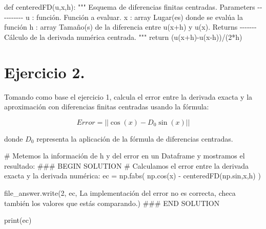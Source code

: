 \documentclass[
  letterpaper,
  DIV=11,
  numbers=noendperiod]{scrreprt}
\newenvironment{Shaded}{\begin{snugshade}}{\end{snugshade}}
\newcommand{\BuiltInTok}[1]{\textcolor[rgb]{0.00,0.23,0.31}{#1}}
\newcommand{\CommentTok}[1]{\textcolor[rgb]{0.37,0.37,0.37}{#1}}
\newcommand{\ControlFlowTok}[1]{\textcolor[rgb]{0.00,0.23,0.31}{#1}}
\newcommand{\DecValTok}[1]{\textcolor[rgb]{0.68,0.00,0.00}{#1}}
\newcommand{\KeywordTok}[1]{\textcolor[rgb]{0.00,0.23,0.31}{#1}}
\newcommand{\NormalTok}[1]{\textcolor[rgb]{0.00,0.23,0.31}{#1}}
\newcommand{\OperatorTok}[1]{\textcolor[rgb]{0.37,0.37,0.37}{#1}}
\newcommand{\RegionMarkerTok}[1]{\textcolor[rgb]{0.00,0.23,0.31}{#1}}
\newcommand{\StringTok}[1]{\textcolor[rgb]{0.13,0.47,0.30}{#1}}
\begin{document}
\begin{Shaded}
\begin{Highlighting}[]
\KeywordTok{def}\NormalTok{ centeredFD(u,x,h):}
    \CommentTok{""" }
\CommentTok{    Esquema de diferencias finitas centradas.}
\CommentTok{    }
\CommentTok{    Parameters}
\CommentTok{    {-}{-}{-}{-}{-}{-}{-}{-}{-}{-}}
\CommentTok{    u : función. }
\CommentTok{    Función a evaluar.}
\CommentTok{    }
\CommentTok{    x : array}
\CommentTok{    Lugar(es) donde se evalúa la función}
\CommentTok{    }
\CommentTok{    h : array}
\CommentTok{    Tamaño(s) de la diferencia entre u(x+h) y u(x).}
\CommentTok{    }
\CommentTok{    Returns}
\CommentTok{    {-}{-}{-}{-}{-}{-}{-}}
\CommentTok{    Cálculo de la derivada numérica centrada.}
\CommentTok{    """}
    \ControlFlowTok{return}\NormalTok{ (u(x}\OperatorTok{+}\NormalTok{h)}\OperatorTok{{-}}\NormalTok{u(x}\OperatorTok{{-}}\NormalTok{h))}\OperatorTok{/}\NormalTok{(}\DecValTok{2}\OperatorTok{*}\NormalTok{h)}
\end{Highlighting}
\end{Shaded}

\section{Ejercicio 2.}\label{ejercicio-2.}

Tomando como base el ejercicio 1, calcula el error entre la derivada
exacta y la aproximación con diferencias finitas centradas usando la
fórmula:

\[
Error = || \cos(x) - D_0 \sin(x)||
\]

donde \(D_0\) representa la aplicación de la fórmula de diferencias
centradas.

\begin{Shaded}
\begin{Highlighting}[]
\CommentTok{\# Metemos la información de h y del error en un Dataframe y mostramos el resultado:}
\CommentTok{\#\#\# }\RegionMarkerTok{BEGIN}\CommentTok{ SOLUTION}
\CommentTok{\# Calculamos el error entre la derivada exacta y la derivada numérica:}
\NormalTok{ec }\OperatorTok{=}\NormalTok{ np.fabs( np.cos(x) }\OperatorTok{{-}}\NormalTok{ centeredFD(np.sin,x,h) )}

\NormalTok{file\_answer.write(}\StringTok{\textquotesingle{}2\textquotesingle{}}\NormalTok{, ec, }\StringTok{\textquotesingle{}La implementación del error no es correcta, checa también los valores que estás comparando.\textquotesingle{}}\NormalTok{)}
\CommentTok{\#\#\# }\RegionMarkerTok{END}\CommentTok{ SOLUTION}

\BuiltInTok{print}\NormalTok{(ec)}
\end{Highlighting}
\end{Shaded}
\end{document}
